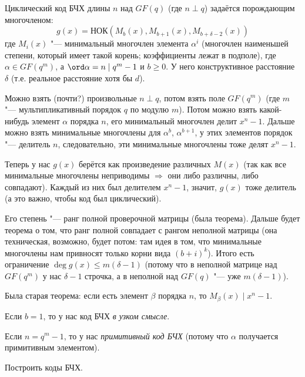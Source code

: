 \begin{Def}
	Циклический код БЧХ длины $n$ над $GF(q)$ (где $n \perp q$)
	задаётся порождающим многочленом:
	\[
	g(x) = НОК(M_b(x), M_{b+1}(x), M_{b+\delta-2}(x))
	\]
	где $M_i(x)$ "--- минимальный многочлен элемента $\alpha^i$
	(многочлен наименьшей степени, который имеет такой корень; коэффициенты лежат в подполе),
	где $\alpha \in GF(q^m)$, а $\ord \alpha = n \mid q^m-1$
	и $b \ge 0$.
	У него конструктивное расстояние $\delta$ (т.е. реальное расстояние хотя бы $d$).
\end{Def}
\begin{lemma}
	Можно взять (почти?) произвольные $n \perp q$,
	потом взять поле $GF(q^m)$ (где $m$ "--- мультипликативный порядок $q$ по модулю $m$).
	Потом можно взять какой-нибудь элемент $\alpha$ порядка $n$,
	его минимальный многочлен делит $x^n-1$.
	Дальше можно взять минимальные многочлены для $\alpha^b$, $\alpha^{b+1}$,
	у этих элементов порядок "--- делитель $n$, следовательно,
	эти минимальные многочлены тоже делят $x^n-1$.

	Теперь у нас $g(x)$ берётся как произведение различных $M(x)$
	(так как все минимальные многочлены неприводимы $\Rightarrow$
	они либо различны, либо совпадают).
	Каждый из них был делителем $x^n-1$, значит, $g(x)$ тоже делитель
	(а это важно, чтобы код был циклический).

	Его степень "--- ранг полной проверочной матрицы
	(была теорема).
	Дальше будет теорема о том, что ранг полной совпадает
	с рангом неполной матрицы (она техническая, возможно, будет потом:
	там идея в том, что минимальные многочлены нам привносят только корни
	вида $(b+i)^k$).
	Итого есть ограничение $\deg g(x) \le m(\delta - 1)$
	(потому что в неполной матрице над $GF(q^m)$ у нас
	$\delta-1$ строчка, а в неполной над $GF(q)$ "--- уже $m(\delta-1)$).
\end{lemma}
\begin{theorem}
	Была старая теорема: если есть элемент $\beta$ порядка
	$n$, то $M_\beta(x) \mid x^n-1$.
\end{theorem}
\begin{Def}
	Если $b=1$, то у нас код БЧХ \textit{в узком смысле}.
\end{Def}
\begin{Def}
	Если $n=q^m-1$, то у нас \textit{примитивный код БЧХ}
	(потому что $\alpha$ получается примитивным элементом).
\end{Def}

\begin{exercise}
	Построить коды БЧХ.
\end{exercise}
